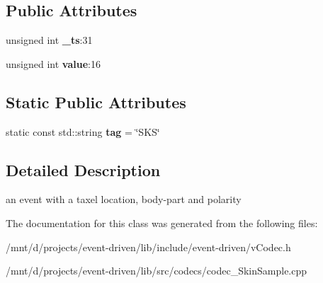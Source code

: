 \subsection*{Public Attributes}
\begin{DoxyCompactItemize}
\item 
\mbox{\label{classev_1_1SkinSample_ac1f3f8035d23ba4450b1e852f3422825}} 
unsigned int {\bfseries \+\_\+ts}\+:31
\item 
\mbox{\label{classev_1_1SkinSample_a23534f3787cad7c9d1c8c2ba8bf5bbf4}} 
unsigned int {\bfseries value}\+:16
\end{DoxyCompactItemize}
\subsection*{Static Public Attributes}
\begin{DoxyCompactItemize}
\item 
\mbox{\label{classev_1_1SkinSample_a40d0036de84cc8071b85157fccb2db54}} 
static const std\+::string {\bfseries tag} = \char`\"{}S\+KS\char`\"{}
\end{DoxyCompactItemize}


\subsection{Detailed Description}
an event with a taxel location, body-\/part and polarity 

The documentation for this class was generated from the following files\+:\begin{DoxyCompactItemize}
\item 
/mnt/d/projects/event-\/driven/lib/include/event-\/driven/v\+Codec.\+h\item 
/mnt/d/projects/event-\/driven/lib/src/codecs/codec\+\_\+\+Skin\+Sample.\+cpp\end{DoxyCompactItemize}
